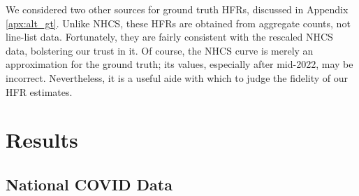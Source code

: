 \documentclass{article}
\begin{document}



We considered two other sources for ground truth HFRs, discussed in Appendix \ref{apx:alt_gt}. Unlike NHCS, these HFRs are obtained from aggregate counts, not line-list data. Fortunately, they are fairly consistent with the rescaled NHCS data, bolstering our trust in it. Of course, the NHCS curve is merely an approximation for the ground truth; its values, especially after mid-2022, may be incorrect. Nevertheless, it is a useful aide with which to judge the fidelity of our HFR estimates.

\section{Results}\label{sec:results}

\subsection{National COVID Data}\label{sec:results_real}

\end{document}
